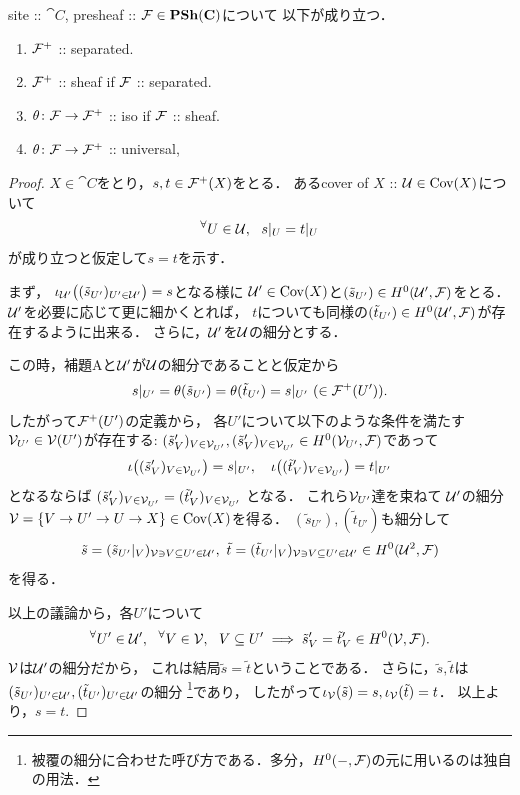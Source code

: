 \documentclass[a4paper]{jsarticle}
\begin{document}
\begin{Lemma}
    site :: $\cat{C}$, presheaf :: $\mathcal{F} \in \mathbf{PSh}(\mathbf{C})$について
    以下が成り立つ．
    \begin{enumerate}[label=(\alph*)]
        \item $\mathcal{F}^+$ :: separated. 
        \item $\mathcal{F}^+$ :: sheaf if $\mathcal{F}$ :: separated.
        \item $\theta \colon \mathcal{F} \to \mathcal{F}^+$ :: iso if $\mathcal{F}$ :: sheaf.
        \item $\theta \colon \mathcal{F} \to \mathcal{F}^+$ :: universal,
    \end{enumerate}
\end{Lemma}
\begin{proof}
    $X \in \cat{C}$をとり，$s, t \in \mathcal{F}^+(X)$をとる．
    あるcover of $X$ :: $\mathcal{U} \in \operatorname{Cov}(X)$について
    \[ {}^{\forall} U \in \mathcal{U},~~ s|_{U}=t|_{U} \]
    が成り立つと仮定して$s=t$を示す．
 
    まず，
    $\iota_{\mathcal{U}'}\big( (\tilde{s}_{U'})_{U' \in \mathcal{U}'} \big)=s$となる様に
    $\mathcal{U}' \in \operatorname{Cov}(X)$と$(\tilde{s}_{U'}) \in H^0(\mathcal{U}', \mathcal{F})$をとる．
    $\mathcal{U}'$を必要に応じて更に細かくとれば，
    $t$についても同様の$(\tilde{t}_{U'}) \in H^0(\mathcal{U}', \mathcal{F})$が存在するように出来る．
    さらに，$\mathcal{U}'$を$\mathcal{U}$の細分とする．
    
    この時，補題Aと$\mathcal{U}'$が$\mathcal{U}$の細分であることと仮定から
    \[ s|_{U'}=\theta(\tilde{s}_{U'})=\theta(\tilde{t}_{U'})=s|_{U'} \ (\in \mathcal{F}^+(U')). \]
    したがって$\mathcal{F}^+(U')$の定義から，
    各$U'$について以下のような条件を満たす$\mathcal{V}_{U'} \in \mathcal{V}(U')$が存在する:
    $(\tilde{s}'_{V})_{V \in \mathcal{V}_{U'}},
        (\tilde{s}'_{V})_{V \in \mathcal{V}_{U'}} \in H^0(\mathcal{V}_{U'}, \mathcal{F})$であって
    \[
        \iota\big( (\tilde{s}'_{V})_{V \in \mathcal{V}_{U'}} \big)=s|_{U'},\quad
        \iota\big( (\tilde{t}'_{V})_{V \in \mathcal{V}_{U'}} \big)=t|_{U'}
    \]
    となるならば
    $(\tilde{s}'_{V})_{V \in \mathcal{V}_{U'}}=(\tilde{t}'_{V})_{V \in \mathcal{V}_{U'}}$
    となる．
    これら$\mathcal{V}_{U'}$達を束ねて
    $\mathcal{U}'$の細分$\mathcal{V}=\{V \to U' \to U \to X\} \in \operatorname{Cov}(X)$を得る．
    $(\tilde{s}_{U'}), (\tilde{t}_{U'})$も細分して
    \[
        \tilde{s}=(\tilde{s}_{U'}|_{V})_{\covV \ni V \subseteq U' \in \covU'},\ 
        \tilde{t}=(\tilde{t}_{U'}|_{V})_{\covV \ni V \subseteq U' \in \covU'}
        \in H^0(\covU^2, \shF)
    \]
    を得る．
    
    以上の議論から，各$U'$について
    \[
        {}^{\forall}  U' \in \mathcal{U}' ,~~ {}^{\forall}  V \in \mathcal{V} ,~~
        V \subseteq U' \implies
        \tilde{s}'_{V}=\tilde{t}'_{V} \in H^0(\mathcal{V}, \mathcal{F}).
    \]
    $\mathcal{V}$は$\mathcal{U}'$の細分だから，
    これは結局$\tilde{s}=\tilde{t}$ということである．
    さらに，$\tilde{s}, \tilde{t}$は
    $(\tilde{s}_{U'})_{U' \in \mathcal{U}'}, (\tilde{t}_{U'})_{U' \in \mathcal{U}'}$の細分
    \footnote{ 被覆の細分に合わせた呼び方である．多分，$H^0(-, \mathcal{F})$の元に用いるのは独自の用法． }であり，
    したがって$\iota_{\mathcal{V}}(\tilde{s})=s, \iota_{\mathcal{V}}(\tilde{t})=t$．
    以上より，$s=t$.


\end{proof}
\end{document}
